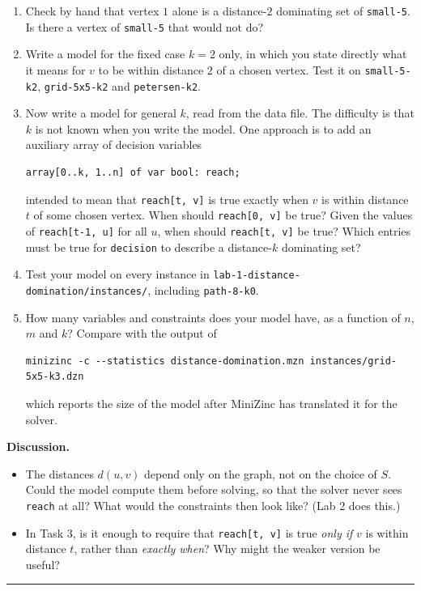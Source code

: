 \documentclass[11pt]{article}
\begin{document}
\begin{enumerate}
\item Check by hand that vertex $1$ alone is a distance-$2$ dominating set of \mbox{\texttt{small-{}5}}. Is there a vertex of \mbox{\texttt{small-{}5}} that would not do?
\item Write a model for the fixed case $k = 2$ only, in which you state directly what it means for $v$ to be within distance $2$ of a chosen vertex. Test it on \mbox{\texttt{small-{}5-{}k2}}, \mbox{\texttt{grid-{}5x5-{}k2}} and \mbox{\texttt{petersen-{}k2}}.
\item Now write a model for general $k$, read from the data file. The difficulty is that $k$ is not known when you write the model. One approach is to add an auxiliary array of decision variables
\begin{Verbatim}
array[0..k, 1..n] of var bool: reach;
\end{Verbatim}

intended to mean that \mbox{\texttt{reach[t, v]}} is true exactly when $v$ is within distance $t$ of some chosen vertex. When should \mbox{\texttt{reach[0, v]}} be true? Given the values of \mbox{\texttt{reach[t-{}1, u]}} for all $u$, when should \mbox{\texttt{reach[t, v]}} be true? Which entries must be true for \mbox{\texttt{decision}} to describe a distance-$k$ dominating set?

\item Test your model on every instance in \texttt{lab-{}1-{}distance-{}domination/\allowbreak{}instances/\allowbreak{}}, including \mbox{\texttt{path-{}8-{}k0}}.
\item How many variables and constraints does your model have, as a function of $n$, $m$ and $k$? Compare with the output of
\begin{Verbatim}
minizinc -c --statistics distance-domination.mzn instances/grid-5x5-k3.dzn
\end{Verbatim}

which reports the size of the model after MiniZinc has translated it for the solver.

\end{enumerate}
\textbf{Discussion.}

\begin{itemize}
\item The distances $d(u, v)$ depend only on the graph, not on the choice of $S$. Could the model compute them before solving, so that the solver never sees \mbox{\texttt{reach}} at all? What would the constraints then look like? (Lab 2 does this.)
\item In Task 3, is it enough to require that \mbox{\texttt{reach[t, v]}} is true \emph{only if} $v$ is within distance $t$, rather than \emph{exactly when}? Why might the weaker version be useful?
\end{itemize}
\bigskip\hrule\bigskip
\end{document}
